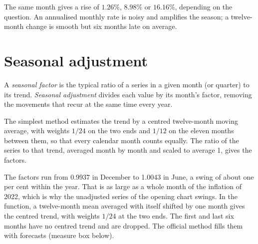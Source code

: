 \label{out:b1:economic-data-python:changes}

The same month gives a rise of $1.26\%$, $8.98\%$ or $16.16\%$, depending on
the question. %
An annualised monthly rate is noisy and amplifies the season; a
twelve-month change is smooth but six months late on average.

\section{Seasonal adjustment}\label{sec:b1:economic-data-python:seasonal}

\begin{definition}\label{def:b1:economic-data-python:seasonal}
A \emph{seasonal factor} is the typical ratio of a series in a given month
(or quarter) to its trend. \emph{Seasonal adjustment} divides each value by
its month's factor, removing the movements that recur at the same time
every year.
\end{definition}

The simplest method estimates the trend by a centred twelve-month moving
average, with weights $1/24$ on the two ends and $1/12$ on the eleven months
between them, so that every calendar month counts equally. The ratio of
the series to that trend, averaged month by month and scaled to average 1,
gives the factors.

\label{lst:b1:economic-data-python:seasonal}

\label{out:b1:economic-data-python:seasonal}

The factors run from 0.9937 in December to 1.0043 in June, a swing of about
one per cent within the year. That is as large as a whole month of the
inflation of 2022, which is why the unadjusted series of the opening chart
swings. In the function, a twelve-month mean averaged with itself shifted
by one month gives the centred trend, with weights $1/24$ at the two ends.
The first and last six months have no centred trend and are dropped. The
official method fills them with forecasts (measure box below).

